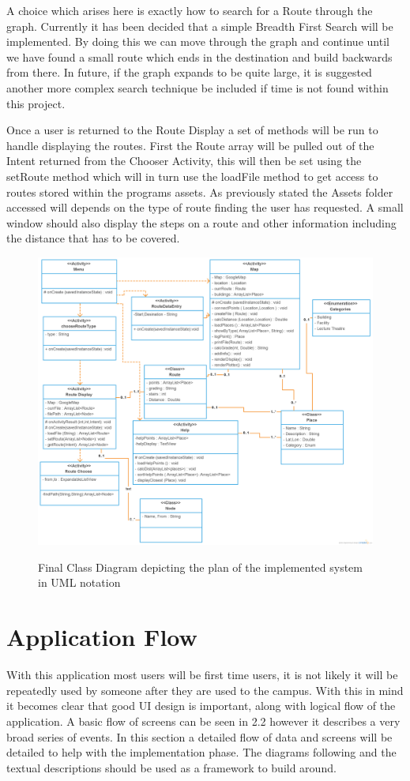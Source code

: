 A choice which arises here is exactly how to search for a Route through the graph. Currently it has been decided that a simple Breadth First Search\cite{bfs} will be implemented. By doing this we can move through the graph and continue until we have found a small route which ends in the destination and build backwards from there. In future, if the graph expands to be quite large, it is suggested another more complex search technique be included if time is not found within this project. 

Once a user is returned to the Route Display a set of methods will be run to handle displaying the routes. First the Route array will be pulled out of the Intent returned from the Chooser Activity, this will then be set using the setRoute method which will in turn use the loadFile method to get access to routes stored within the programs assets. As previously stated the Assets folder accessed will depends on the type of route finding the user has requested. A small window should also display the steps on a route and other information including the distance that has to be covered. 


\begin{figure}
\includegraphics[scale=0.25]{Chapter2/class.png} \\
\caption[Class Diagram]{Final Class Diagram depicting the plan of the implemented system in UML notation}
\end{figure}
\newpage
\section{Application Flow}
With this application most users will be first time users, it is not likely it will be repeatedly used by someone after they are used to the campus. With this in mind it becomes clear that good UI design is important, along with logical flow of the application. A basic flow of screens can be seen in 2.2 however it describes a very broad series of events. In this section a detailed flow of data and screens will be detailed to help with the implementation phase. The diagrams following and the textual descriptions should be used as a framework to build around. 
